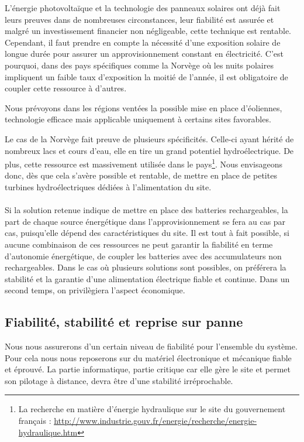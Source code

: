 \documentclass[a4paper, 11pt]{article}
\begin{document}
L'énergie photovoltaïque et la technologie des panneaux solaires ont déjà fait leurs preuves dans de nombreuses circonstances, leur fiabilité est assurée et malgré un investissement financier non négligeable, cette technique est rentable. Cependant, il faut prendre en compte la nécessité d'une exposition solaire de longue durée pour assurer un approvisionnement constant en électricité. C'est pourquoi, dans des pays spécifiques comme la Norvège où les nuits polaires impliquent un faible taux d'exposition la moitié de l'année, il est obligatoire de coupler cette ressource à d'autres.

Nous prévoyons dans les régions ventées la possible mise en place d'éoliennes, technologie efficace mais applicable uniquement à certains sites favorables.

Le cas de la Norvège fait preuve de plusieurs spécificités. Celle-ci ayant hérité de nombreux lacs et cours d'eau, elle en tire un grand potentiel hydroélectrique. De plus, cette ressource est massivement utilisée dans le pays\footnote{La recherche en matière d'énergie hydraulique sur le site du gouvernement français : \url{http://www.industrie.gouv.fr/energie/recherche/energie-hydraulique.htm}}. Nous envisageons donc, dès que cela s'avère possible et rentable, de mettre en place de petites turbines hydroélectriques dédiées à l'alimentation du site.

\paragraph{}
Si la solution retenue indique de mettre en place des batteries rechargeables, la part de chaque source énergétique dans l'approvisionnement se fera au cas par cas, puisqu'elle dépend des caractéristiques du site. Il est tout à fait possible, si aucune combinaison de ces ressources ne peut garantir la fiabilité en terme d'autonomie énergétique, de coupler les batteries avec des accumulateurs non rechargeables. Dans le cas où plusieurs solutions sont possibles, on préférera la stabilité et la garantie d'une alimentation électrique fiable et continue. Dans un second temps, on privilègiera l'aspect économique.


\subsection{Fiabilité, stabilité et reprise sur panne}
Nous nous assurerons d'un certain niveau de fiabilité pour l'ensemble du système. Pour cela nous nous reposerons sur du matériel électronique et mécanique fiable et éprouvé. La partie informatique, partie critique car elle gère le site et permet son pilotage à distance, devra être d'une stabilité irréprochable.
\end{document}
